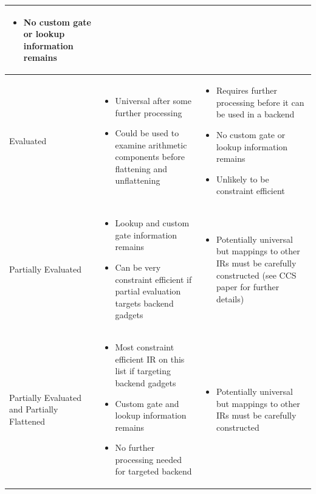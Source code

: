 \documentclass[
    9pt,            %
    techreport,        %
    affiltop,       %
]{art}
\begin{document}
\begin{tabular}{p{3cm}|p{5cm}|p{5cm}}
\begin{itemize}
        \item No custom gate or lookup information remains
    \end{itemize}
    \\
    \hline
     \vfill Evaluated &
     \begin{itemize} \setlength{\itemindent}{-1.5em}
         \item Universal after some further processing
         \item Could be used to examine arithmetic components before flattening and unflattening
     \end{itemize} & 
     \begin{itemize} \setlength{\itemindent}{-1.5em}
         \item Requires further processing before it can be used in a backend
         \item No custom gate or lookup information remains
         \item Unlikely to be constraint efficient
     \end{itemize}     
     \\
     \hline
     \vfill Partially Evaluated &
     \begin{itemize} \setlength{\itemindent}{-1.5em}
         \item Lookup and custom gate information remains
         \item Can be very constraint efficient if partial evaluation targets backend gadgets
     \end{itemize} & 
     \begin{itemize} \setlength{\itemindent}{-1.5em}
         \item Potentially universal but mappings to other IRs must be carefully constructed (see CCS paper for further details)
     \end{itemize} 
     \\
     \hline
     \vfill Partially Evaluated and Partially Flattened &
     \begin{itemize} \setlength{\itemindent}{-1.5em}
         \item Most constraint efficient IR on this list if targeting backend gadgets
         \item Custom gate and lookup information remains
         \item No further processing needed for targeted backend
     \end{itemize} & 
     \begin{itemize} \setlength{\itemindent}{-1.5em}
         \item Potentially universal but mappings to other IRs must be carefully constructed 
     \end{itemize}
     \\ 
     \hline
\end{tabular}
\end{document}
